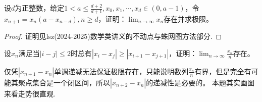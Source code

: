\documentclass[../../main.tex]{subfiles}%
\begin{document}
\begin{example}
设\(d\)为正整数，给定\(1 < a\leqslant \frac{d + 2}{d + 1},x_0,x_1,\cdots,x_d\in(0,a - 1)\)，令\(x_{n + 1}=x_n(a - x_{n - d}),n\geqslant  d\)，证明：\(\lim_{n\rightarrow\infty}x_n\)存在并求极限。
\end{example}
\begin{proof}
证明见lsz(2024-2025)数学类讲义的不动点与蛛网图方法部分.
\end{proof}



\begin{example}
设\(x_n\)满足当\(|i - j|\leqslant 2\)时总有\(|x_i - x_j|\geqslant |x_{i + 1}-x_{j + 1}|\)，证明：\(\lim_{n\rightarrow\infty}\frac{x_n}{n}\)存在。
\end{example}
\begin{remark}
仅凭\(|x_{n + 1}-x_n|\)单调递减无法保证极限存在，只能说明数列\(\frac{x_n}{n}\)有界，但是完全有可能其聚点集合是一个闭区间，所以\(|x_{n + 2}-x_n|\)的递减性是必要的。
本题其实画图来看走势很直观.
\end{remark}
\end{document}
